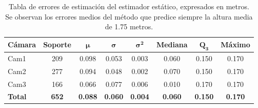 \begin{table}[!ht]
  \centering
  \scriptsize
\begin{tabular}{|l|c|c|c|c|c|c|c|}
\hline
\rowcolor[HTML]{FFCB2F}
\textbf{Cámara} & \textbf{Soporte} & $\bm{\mu}$ & $\bm{\sigma}$ & $\bm{\sigma^2}$ & \textbf{Mediana} & $\bm{Q_3}$ & \textbf{Máximo} \\
\hline
Cam1 & 209 & 0.098 & 0.053 & 0.003 &0.060 & 0.150 & 0.170 \\
\hline
Cam2 & 277 & 0.094 & 0.048 & 0.002 &0.070 & 0.150 & 0.170 \\
\hline
Cam3 & 166 & 0.066 & 0.077 & 0.006 &0.010 & 0.170 & 0.170 \\
\hline
\textbf{Total} & \textbf{652} & \textbf{0.088} & \textbf{0.060} & \textbf{0.004} & \textbf{0.060} & \textbf{0.150} & \textbf{0.170} \\
\hline
\end{tabular}
\caption[Tabla de errores de estimación del estimador estático, expresados en metros.]{
  Tabla de errores de estimación del estimador estático, expresados en metros.
  Se observan los errores medios del método que predice siempre la altura media de 1.75 metros.
}
\label{tab:BaselineDummy}
\end{table}

